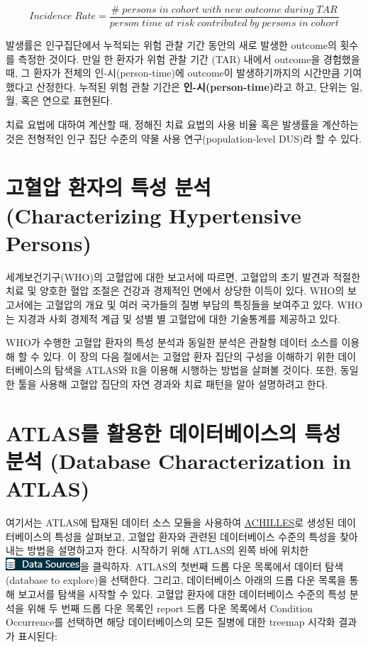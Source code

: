 \documentclass[11pt]{book}
\theoremstyle{definition}
\theoremstyle{definition}
\theoremstyle{definition}
\theoremstyle{remark}
\begin{document}
\[
Incidence\;Rate = \frac{\#\;persons\;in\;cohort\;with\;new\;outcome\;during\;TAR}{person\;time\;at\;risk\;contributed\;by\;persons\;in\;cohort}
\]

발생률은 인구집단에서 누적되는 위험 관찰 기간 동안의 새로 발생한
outcome의 횟수를 측정한 것이다. 만일 한 환자가 위험 관찰 기간 (TAR)
내에서 outcome을 경험했을 때, 그 환자가 전체의 인-시(person-time)에
outcome이 발생하기까지의 시간만큼 기여했다고 산정한다. 누적된 위험 관찰
기간은 \textbf{인-시(person-time)}라고 하고, 단위는 일, 월, 혹은 연으로
표현된다.  

치료 요법에 대하여 계산할 때, 정해진 치료 요법의 사용 비율 혹은 발생률을
계산하는 것은 전형적인 인구 집단 수준의 약물 사용 연구(population-level
DUS)라 할 수 있다.

\section{고혈압 환자의 특성 분석 (Characterizing Hypertensive
Persons)}\label{----characterizing-hypertensive-persons}

세계보건기구(WHO)의 고혈압에 대한 보고서\citep{WHOHypertension}에
따르면, 고혈압의 초기 발견과 적절한 치료 및 양호한 혈압 조절은 건강과
경제적인 면에서 상당한 이득이 있다. WHO의 보고서에는 고혈압의 개요 및
여러 국가들의 질병 부담의 특징들을 보여주고 있다. WHO는 지경과 사회
경제적 계급 및 성별 별 고혈압에 대한 기술통계를 제공하고 있다.

WHO가 수행한 고혈압 환자의 특성 분석과 동일한 분석은 관찰형 데이터
소스를 이용해 할 수 있다. 이 장의 다음 절에서는 고혈압 환자 집단의
구성을 이해하기 위한 데이터베이스의 탐색을 ATLAS와 R을 이용해 시행하는
방법을 살펴볼 것이다. 또한, 동일한 툴을 사용해 고혈압 집단의 자연 경과와
치료 패턴을 알아 설명하려고 한다.

\section{ATLAS를 활용한 데이터베이스의 특성 분석 (Database
Characterization in
ATLAS)}\label{atlas-----database-characterization-in-atlas}

여기서는 ATLAS에 탑재된 데이터 소스 모듈을 사용하여
\href{https://github.com/OHDSI/Achilles}{ACHILLES}로 생성된
데이터베이스의 특성을 살펴보고, 고혈압 환자와 관련된 데이터베이스 수준의
특성을 찾아내는 방법을 설명하고자 한다. 시작하기 위해 ATLAS의 왼쪽 바에
위치한
\includegraphics{images/Characterization/atlasDataSourcesMenuItem.png}을
클릭하자. ATLAS의 첫번째 드롭 다운 목록에서 데이터 탐색(database to
explore)을 선택한다. 그리고, 데이터베이스 아래의 드롭 다운 목록을 통해
보고서를 탐색을 시작할 수 있다. 고혈압 환자에 대한 데이터베이스 수준의
특성 분석을 위해 두 번째 드롭 다운 목록인 report 드롭 다운 목록에서
Condition Occurrence를 선택하면 해당 데이터베이스의 모든 질병에 대한
treemap 시각화 결과가 표시된다:
\end{document}
